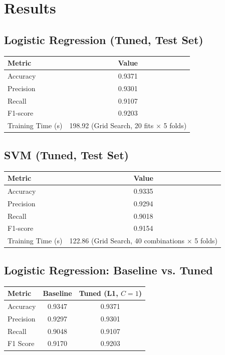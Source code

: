 \documentclass[12pt,a4paper]{article}
\begin{document}
\section{Results}

\subsection*{Logistic Regression (Tuned, Test Set)}
\begin{tabular}{lc}
\toprule
Metric & Value\\
\midrule
Accuracy & 0.9371 \\
Precision & 0.9301 \\
Recall & 0.9107 \\
F1-score & 0.9203 \\
Training Time (s) & 198.92 (Grid Search, 20 fits $\times$ 5 folds) \\
\bottomrule
\end{tabular}

\subsection*{SVM (Tuned, Test Set)}
\begin{tabular}{lc}
\toprule
Metric & Value\\
\midrule
Accuracy & 0.9335 \\
Precision & 0.9294 \\
Recall & 0.9018 \\
F1-score & 0.9154 \\
Training Time (s) & 122.86 (Grid Search, 40 combinations $\times$ 5 folds) \\
\bottomrule
\end{tabular}

\subsection*{Logistic Regression: Baseline vs. Tuned}
\begin{tabular}{lcc}
\toprule
Metric & Baseline & Tuned (L1, $C{=}1$)\\
\midrule
Accuracy  & 0.9347 & 0.9371 \\
Precision & 0.9297 & 0.9301 \\
Recall    & 0.9048 & 0.9107 \\
F1 Score  & 0.9170 & 0.9203 \\
\bottomrule
\end{tabular}
\end{document}
